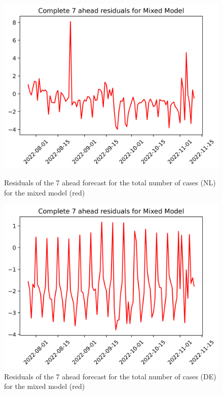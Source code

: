 \begin{figure}

\begin{minipage}{.45\textwidth}
  \centering
  \includegraphics[width=\linewidth]{pics/7_ah/7_ahead_errors_Mixed Model.png}
  \caption{Residuals of the 7 ahead forecast for the total number of cases (NL) for the mixed model (red)}
  \label{fig:tot_cases_error_7_mix}
\end{minipage}
\begin{minipage}{.45\textwidth}
  \centering
  \includegraphics[width=\linewidth]{pics/7_ah/DE_7_ahead_errors_Mixed Model.png}
  \caption{Residuals of the 7 ahead forecast for the total number of cases (DE) for the mixed model (red)}
  \label{fig:tot_cases_error_7_mix_DE}
\end{minipage}

\end{figure}

